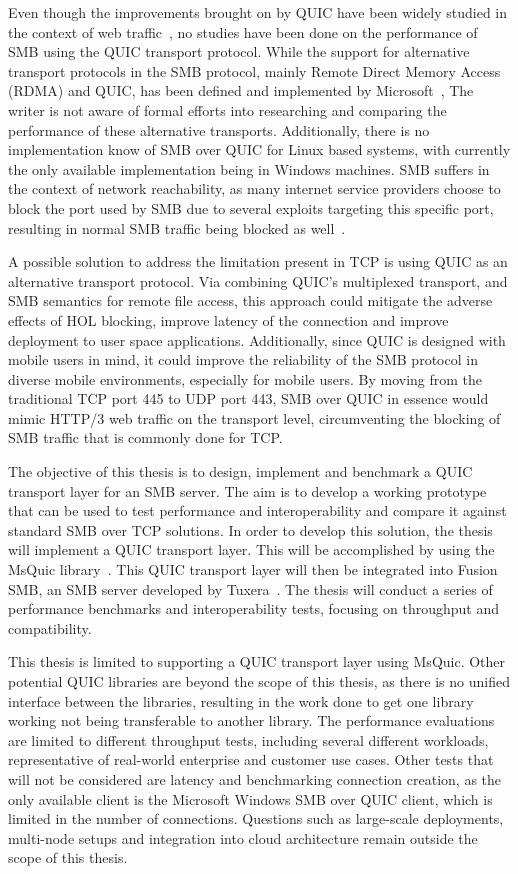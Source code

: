 \documentclass[english, 12pt, a4paper, elec, utf8, a-2b, online]{aaltothesis}
\begin{document}
Even though the improvements brought on by QUIC have been widely studied in the context
of web traffic~\cite{quic_better_for_what,evaluating_quic_perf,quic_and_tcp_performance},
no studies have been done on the performance of SMB using the QUIC transport protocol.
While the support for alternative transport protocols in the SMB protocol, mainly
Remote Direct Memory Access (RDMA) and QUIC, has been defined and implemented by Microsoft~\cite{smb2},
The writer is not aware of formal
efforts into researching and comparing the performance of these alternative transports.
Additionally, there is no implementation know of SMB over QUIC for Linux
based systems, with currently the only available implementation being in Windows machines.
SMB suffers in the context of network reachability, as many internet service providers
choose to block the port used by SMB due to several exploits targeting this specific port,
resulting in normal SMB traffic being blocked as well~\cite{bitag_port_blocking}.

A possible solution to address the limitation present in TCP is using
QUIC as an alternative transport protocol. Via combining QUIC's multiplexed transport,
and SMB semantics for remote file access, this approach could mitigate the adverse effects of
HOL blocking, improve latency of the connection and improve deployment to user space
applications. Additionally, since QUIC is designed with mobile users in mind, it could
improve the reliability of the SMB protocol in diverse mobile environments, especially
for mobile users. By moving from the traditional TCP port 445 to UDP port 443,
SMB over QUIC in essence would mimic HTTP/3 web traffic on the transport level,
circumventing the blocking of SMB traffic that is commonly done for TCP.

The objective of this thesis is to design, implement and benchmark a QUIC transport
layer for an SMB server. The aim is to develop a working prototype that can be used to
test performance and interoperability and compare it against standard SMB over TCP solutions.
In order to develop this solution, the thesis will implement a QUIC transport layer. This
will be accomplished by using the MsQuic library~\cite{msquic}. This QUIC transport layer
will then be integrated into Fusion SMB, an SMB server developed by Tuxera~\cite{fusion}.
The thesis will conduct a series of performance benchmarks and interoperability tests,
focusing on throughput and compatibility.

This thesis is limited to supporting a QUIC transport layer using MsQuic. Other
potential QUIC libraries are beyond the scope of this thesis, as there is no
unified interface between the libraries, resulting in the work done to get one
library working not being transferable to another library. The performance evaluations
are limited to different throughput tests, including several different workloads, representative of
real-world enterprise and customer use cases.
Other tests that will not be considered are latency and benchmarking connection creation,
as the only available client is the Microsoft Windows SMB over QUIC client, which is
limited in the number of connections. Questions such as large-scale deployments,
multi-node setups and integration into cloud architecture remain outside the scope
of this thesis.
\end{document}
